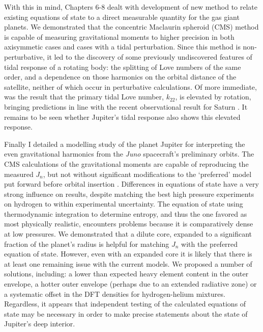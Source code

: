 With this in mind, Chapters 6-8 dealt with development of new method to relate
existing equations of state to a direct measurable quantity for the gas giant
planets. We demonstrated that the concentric Maclaurin spheroid (CMS) method is
capable of measuring gravitational moments to higher precision in both axisymmetic
cases and cases with a tidal perturbation. Since this method is non-perturbative, it
led to the discovery of some previously undiscovered features of tidal response of a
rotating body: the splitting of Love numbers of the same order, and a dependence on
those harmonics on the orbital distance of the satellite, neither of which occur in
perturbative calculations. Of more immediate, was the result that the primary
tidal Love number, $k_{22}$, is elevated by rotation, bringing predictions in line
with the recent observational result for Saturn \citep{lainey2016}. It remains to be
seen whether Jupiter's tidal response also shows this elevated response.

Finally I detailed a modelling study of the planet Jupiter for interpreting the even
gravitational harmonics from the \textit{Juno} spacecraft's preliminary orbits. The
CMS calculations of the gravitational moments are capable of reproducing the measured
$J_n$, but not without significant modifications to the `preferred' model put forward
before orbital insertion \citep{hubbard2016}. Differences in equations of state have
a very strong influence on results, despite matching the best high pressure
experiments on hydrogen to within experimental uncertainty. The equation of state
using thermodynamic integration to determine entropy, and thus the one favored as
most physically realistic, encounters problems because it is comparatively dense at
low pressures. We demonstrated that a dilute core, expanded to a significant fraction
of the planet's radius is helpful for matching $J_n$ with the preferred equation of
state. However, even with an expanded core it is likely that there is at least one
remaining issue with the current models. We proposed a number of solutions,
including: a lower than expected heavy element content in the outer envelope, a
hotter outer envelope (perhaps due to an extended radiative zone) or a systematic
offset in the DFT densities for hydrogen-helium mixtures. Regardless, it appears that
independent testing of the calculated equations of state may be necessary in order to
make precise statements about the state of Jupiter's deep interior.
